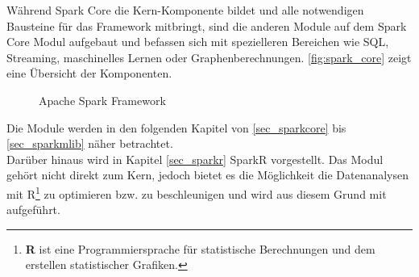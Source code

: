 \noindent
Während Spark Core die Kern-Komponente bildet und alle notwendigen Bausteine für das Framework mitbringt, sind die anderen Module auf dem Spark Core Modul aufgebaut und befassen sich mit spezielleren Bereichen wie SQL, Streaming, maschinelles Lernen oder Graphenberechnungen. \autoref{fig:spark_core} zeigt eine Übersicht der Komponenten. \\

\begin{figure}[h]
  \centering
  \caption{Apache Spark Framework \cite{DATABRICK_SPARK_KEY_TERMS}}\label{fig:spark_core}
\end{figure}


\noindent
Die Module werden in den folgenden Kapitel von \ref{sec_sparkcore} bis \ref{sec_sparkmlib} näher betrachtet. \\

\noindent
Darüber hinaus wird in Kapitel \ref{sec_sparkr} SparkR vorgestellt. Das Modul gehört nicht direkt zum Kern, jedoch bietet es die Möglichkeit die Datenanalysen mit R\footnote{\textbf{R} ist eine Programmiersprache für statistische Berechnungen und dem erstellen statistischer Grafiken. } zu optimieren bzw. zu beschleunigen und wird aus diesem Grund mit aufgeführt.











\newpage
